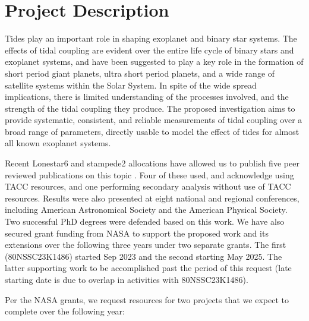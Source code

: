 \documentclass[12pt]{article}
\begin{document}
\maketitle

\vspace{-15mm}

\section{Project Description}

Tides play an important role in shaping exoplanet and binary star systems. The
effects of tidal coupling are evident over the entire life cycle of binary stars
and exoplanet systems, and have been suggested to play a key role in the
formation of short period giant planets, ultra short period planets, and a wide
range of satellite systems within the Solar System. In spite of the wide spread
implications, there is limited understanding of the processes involved, and the
strength of the tidal coupling they produce. The proposed investigation aims to
provide systematic, consistent, and reliable measurements of tidal coupling over
a broad range of parameters, directly usable to model the effect of tides for
almost all known exoplanet systems.

Recent Lonestar6 and stampede2 allocations have allowed us to publish five peer
reviewed publications on this topic \citep{Mahmud_et_al_23, Patel_et_al_23,
Penev_Schussler_22, Anderson_et_al_21, Penev_et_al_18}. Four of these used, and
acknowledge using TACC resources, and one performing secondary analysis without
use of TACC resources. Results were also presented at eight national and
regional conferences, including American Astronomical Society and the American
Physical Society. Two successful PhD degrees were defended based on this work.
We have also secured grant funding from NASA to support the proposed work and
its extensions over the following three years under two separate grants. The
first (80NSSC23K1486) started Sep 2023 and the second starting May 2025. The
latter supporting work to be accomplished past the period of this request (late
starting date is due to overlap in activities with 80NSSC23K1486).

Per the NASA grants, we request resources for two projects that we expect to
complete over the following year:
\end{document}

